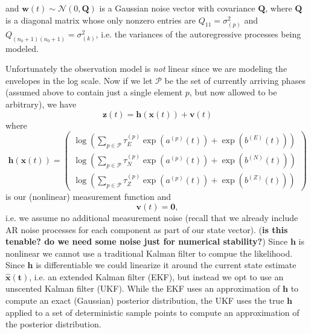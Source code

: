 \documentclass{article}
\begin{document}
and $\mathbf{w}(t) \sim \mathcal{N}(0, \mathbf{Q})$ is a Gaussian noise vector with covariance $\mathbf{Q}$, where $\mathbf{Q}$ is a diagonal matrix whose only nonzero entries are $Q_{11} = \sigma_{(p)}^2$ and $Q_{(n_0+1)(n_0+1)} = \sigma_{(k)}^2$, i.e. the variances of the autoregressive processes being modeled.

Unfortunately the observation model is {\em not} linear since we are modeling the envelopes in the log scale. Now if we let $\mathcal{P}$ be the set of currently arriving phases (assumed above to contain just a single element $p$, but now allowed to be arbitrary), we have
\[\mathbf{z}(t) = \mathbf{h}(\mathbf{x}(t)) + \mathbf{v}(t)\]
where 
\[\mathbf{h}(\mathbf{x}(t)) = \left(\begin{array}{c}\log\left(\sum_{p\in\mathcal{P}} \tau^{(p)}_E \exp\left(a^{(p)}(t)\right) + \exp(b^{(E)}(t)) \right)\\
\log\left(\sum_{p\in\mathcal{P}} \tau^{(p)}_N \exp\left(a^{(p)}(t)\right) + \exp(b^{(N)}(t)) \right)\\
\log\left(\sum_{p\in\mathcal{P}} \tau^{(p)}_Z \exp\left(a^{(p)}(t)\right) + \exp(b^{(Z)}(t)) \right)
\end{array}\right)\]
is our (nonlinear) measurement function and 
\[\mathbf{v}(t) = \mathbf{0},\]
i.e. we assume no additional measurement noise (recall that we already include AR noise processes for each component as part of our state vector). ({\bf is this tenable? do we need some noise just for numerical stability?}) Since $\mathbf{h}$ is nonlinear we cannot use a traditional Kalman filter to compue the likelihood. Since $\mathbf{h}$ is differentiable we could linearize it around the current state estimate $\mathbf{\hat{x}(t)}$, i.e. an extended Kalman filter (EKF), but instead we opt to use an unscented Kalman filter (UKF). While the EKF uses an approximation of $\mathbf{h}$ to compute an exact (Gaussian) posterior distribution, the UKF uses the true $\mathbf{h}$ applied to a set of deterministic sample points to compute an approximation of the posterior distribution. 
\end{document}
